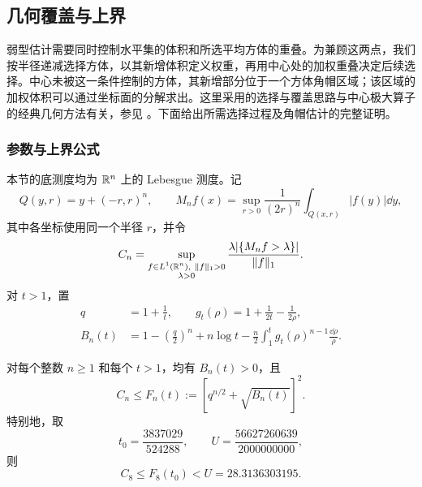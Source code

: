 \subsection{几何覆盖与上界}\label{up:section}

弱型估计需要同时控制水平集的体积和所选平均方体的重叠。为兼顾这两点，我们按半径递减选择方体，以其新增体积定义权重，再用中心处的加权重叠决定后续选择。中心未被这一条件控制的方体，其新增部分位于一个方体角帽区域；该区域的加权体积可以通过坐标面的分解求出。这里采用的选择与覆盖思路与中心极大算子的经典几何方法有关，参见 \cite{SteinStromberg1983,AldazKissing2020}。下面给出所需选择过程及角帽估计的完整证明。

\subsubsection{参数与上界公式}

本节的底测度均为 $\mathbb{R}^n$ 上的 Lebesgue 测度。记
\[
 Q(y,r)=y+(-r,r)^n,\qquad
 M_nf(x)=\sup_{r>0}\frac{1}{(2r)^n}
             \int_{Q(x,r)}|f(y)|\dd y,
\]
其中各坐标使用同一个半径 $r$，并令
\[
 C_n=\sup_{\substack{f\in L^1(\R^n),\ \|f\|_1>0\\\lambda>0}}
 \frac{\lambda|\{M_nf>\lambda\}|}{\|f\|_1}.
\]
对 $t>1$，置
\begin{equation}\label{up:B}
\begin{split}
 q&=1+\frac1t,\qquad
 g_t(\rho)=1+\frac{1}{2t}-\frac{1}{2\rho},\\
 B_n(t)&=1-\left(\frac q2\right)^n+n\log t
       -\frac n2\int_1^t g_t(\rho)^{n-1}\frac{\dd\rho}{\rho}.
\end{split}
\end{equation}

\begin{theorem}\label{up:main}
对每个整数 $n\ge1$ 和每个 $t>1$，均有 $B_n(t)>0$，且
\begin{equation}\label{up:bound}
 C_n\le F_n(t):=\left[q^{n/2}+\sqrt{B_n(t)}\right]^2.
\end{equation}
特别地，取
\begin{equation}\label{up:t8}
 t_0=\frac{3837029}{524288},\qquad
 U=\frac{56627260639}{2000000000},
\end{equation}
则
\begin{equation}\label{up:eight}
 C_8\le F_8(t_0)<U=28.3136303195.
\end{equation}
\end{theorem}

